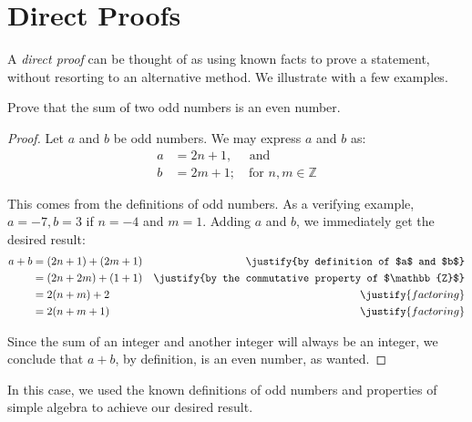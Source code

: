 \documentclass[../proofs.tex]{subfiles}
\begin{document}
\chapter{Direct Proofs}
  A \emph{direct proof} can be
  thought of as using known facts to prove a statement, without resorting to an
  alternative method. We illustrate with a few examples. \\

\begin{expl}
  Prove that the sum of two odd numbers is an even number.

\begin{proof}
Let $a$ and $b$ be odd numbers. We may express $a$ and $b$ as:
\begin{align*}
  a &= 2n + 1, \quad \text{ and}   \\
  b &= 2m + 1; \quad \text{for } n,m \in \mathbb{Z}
\end{align*}

This comes from the definitions of odd numbers. As a verifying example,
$a = -7, b = 3$ if $n = -4$ and $m = 1$. Adding $a$ and $b$, we immediately get
the desired result:
\begin{align*}
  a + b &= (2n + 1) + (2m + 1) 	& \justify{by definition of $a$ and $b$} \\
       &= (2n + 2m) + (1 + 1) 	& \justify{by the commutative property of $\mathbb{Z}$} \\
       &= 2(n+m) + 2			& \justify{factoring} \\
       &= 2(n+m+1)				& \justify{factoring}
\end{align*}

Since the sum of an integer and another integer will always be an integer, we conclude that $a+b$, by definition, is an even number, as wanted.

\end{proof}

\end{expl}

In this case, we used the known definitions of odd numbers and properties of
simple algebra to achieve our desired result.
\end{document}

